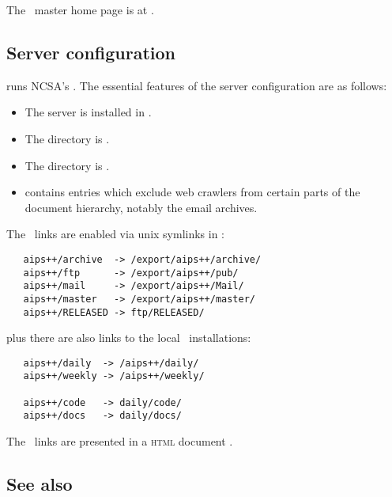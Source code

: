 \noindent
The \aipspp\ master home page is at
.

\subsection*{Server configuration}

 runs NCSA's .  The essential features of
the server configuration are as follows:

\begin{itemize}
\item
   The server is installed in .

\item
   The   directory is .

\item
   The   directory is
   .

\item
    contains entries which exclude web crawlers
   from certain parts of the document hierarchy, notably the email archives.
\end{itemize}

\noindent
The \aipspp\ links are enabled via unix symlinks in :

\begin{verbatim}
   aips++/archive  -> /export/aips++/archive/
   aips++/ftp      -> /export/aips++/pub/
   aips++/mail     -> /export/aips++/Mail/
   aips++/master   -> /export/aips++/master/
   aips++/RELEASED -> ftp/RELEASED/
\end{verbatim}

\noindent
plus there are also links to the local \aipspp\ installations:

\begin{verbatim}
   aips++/daily  -> /aips++/daily/
   aips++/weekly -> /aips++/weekly/

   aips++/code   -> daily/code/
   aips++/docs   -> daily/docs/
\end{verbatim}

\noindent
The \aipspp\ links are presented in a \textsc{html} document
.

\subsection*{See also}
 
